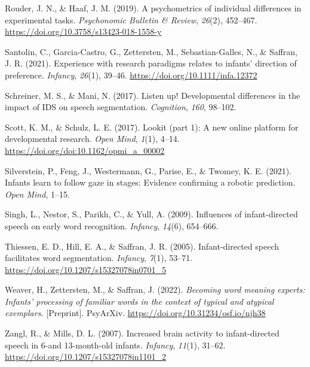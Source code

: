 \documentclass[
  man,floatsintext]{apa6}
\newlength{\cslhangindent}
\newlength{\cslentryspacingunit} %
\newenvironment{CSLReferences}[2] %
 {%
  \setlength{\parindent}{0pt}
  \ifodd #1
  \let\oldpar\par
  \def\par{\hangindent=\cslhangindent\oldpar}
  \fi
  \setlength{\parskip}{#2\cslentryspacingunit}
 }%
 {}
\begin{document}
\begin{CSLReferences}{1}{0}
\leavevmode{}%
Rouder, J. N., \& Haaf, J. M. (2019). A psychometrics of individual differences in experimental tasks. \emph{Psychonomic Bulletin \& Review}, \emph{26}(2), 452--467. \url{https://doi.org/10.3758/s13423-018-1558-y}

\leavevmode{}%
Santolin, C., Garcia-Castro, G., Zettersten, M., Sebastian-Galles, N., \& Saffran, J. R. (2021). Experience with research paradigms relates to infants' direction of preference. \emph{Infancy}, \emph{26}(1), 39--46. \url{https://doi.org/10.1111/infa.12372}

\leavevmode{}%
Schreiner, M. S., \& Mani, N. (2017). Listen up! Developmental differences in the impact of IDS on speech segmentation. \emph{Cognition}, \emph{160}, 98--102.

\leavevmode{}%
Scott, K. M., \& Schulz, L. E. (2017). Lookit (part 1): A new online platform for developmental research. \emph{Open Mind}, \emph{1}(1), 4--14. \url{https://doi.org/doi:10.1162/opmi_a_00002}

\leavevmode{}%
Silverstein, P., Feng, J., Westermann, G., Parise, E., \& Twomey, K. E. (2021). Infants learn to follow gaze in stages: Evidence confirming a robotic prediction. \emph{Open Mind}, 1--15.

\leavevmode{}%
Singh, L., Nestor, S., Parikh, C., \& Yull, A. (2009). Influences of infant-directed speech on early word recognition. \emph{Infancy}, \emph{14}(6), 654--666.

\leavevmode{}%
Thiessen, E. D., Hill, E. A., \& Saffran, J. R. (2005). Infant-directed speech facilitates word segmentation. \emph{Infancy}, \emph{7}(1), 53--71. \url{https://doi.org/10.1207/s15327078in0701_5}

\leavevmode{}%
Weaver, H., Zettersten, M., \& Saffran, J. (2022). \emph{Becoming word meaning experts: Infants' processing of familiar words in the context of typical and atypical exemplars.} {[}Preprint{]}. PsyArXiv. \url{https://doi.org/10.31234/osf.io/njh38}

\leavevmode{}%
Zangl, R., \& Mills, D. L. (2007). Increased brain activity to infant-directed speech in 6-and 13-month-old infants. \emph{Infancy}, \emph{11}(1), 31--62. \url{https://doi.org/10.1207/s15327078in1101_2}

\end{CSLReferences}

\endgroup
\end{document}
